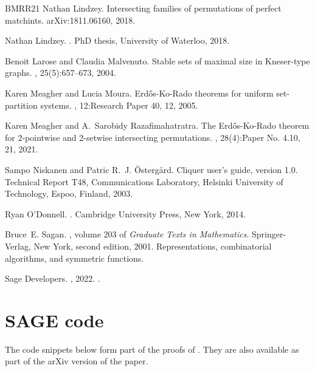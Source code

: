\documentclass[10pt,a4paper]{amsart}
\theoremstyle{definition}
\begin{document}
\begin{thebibliography}{BMRR21}
Nathan Lindzey.
\newblock Intersecting families of permutations of perfect matchints.
\newblock arXiv:1811.06160, 2018.

Nathan Lindzey.
.
\newblock PhD thesis, University of Waterloo, 2018.

Benoit Larose and Claudia Malvenuto.
\newblock Stable sets of maximal size in {K}neser-type graphs.
, 25(5):657--673, 2004.

Karen Meagher and Lucia Moura.
\newblock Erd{\H{o}}s-{K}o-{R}ado theorems for uniform set-partition systems.
, 12:Research Paper 40, 12, 2005.

Karen Meagher and A.~Sarobidy Razafimahatratra.
\newblock The {E}rd{\H{o}}s-{K}o-{R}ado theorem for 2-pointwise and 2-setwise
  intersecting permutations.
, 28(4):Paper No. 4.10, 21, 2021.

Sampo Niskanen and Patric R.~J. {\"O}sterg{\aa}rd.
\newblock Cliquer user's guide, version 1.0.
\newblock Technical Report T48, Communications Laboratory, Helsinki University
  of Technology, Espoo, Finland, 2003.

Ryan O'Donnell.
.
\newblock Cambridge University Press, New York, 2014.

Bruce~E. Sagan.
, volume 203 of {\em Graduate Texts in
  Mathematics}.
\newblock Springer-Verlag, New York, second edition, 2001.
\newblock Representations, combinatorial algorithms, and symmetric functions.

{Sage Developers}.
, 2022.
.

\end{thebibliography}

\appendix

\section{SAGE code} \label{apx:SAGE}

The code snippets below form part of the proofs of . They are also available as part of the arXiv version of the paper.
\end{document}
